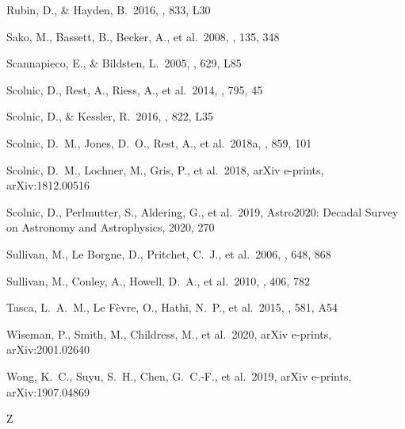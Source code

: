 \documentclass[]{aa} %
\begin{document}
\begin{thebibliography}{}
 Rubin, D., \& Hayden, B.\ 2016, \apjl, 833, L30


 Sako, M., Bassett, B., Becker, A., et al.\ 2008, \aj, 135, 348

 Scannapieco, E., \& Bildsten, L.\ 2005, \apjl, 629, L85 

 Scolnic, D., Rest, A., Riess, A., et al.\ 2014, \apj, 795, 45

 Scolnic, D., \& Kessler, R.\ 2016, \apjl, 822, L35


 Scolnic, D.~M., Jones, D.~O., Rest, A., et al.\ 2018a, \apj, 859, 101

 Scolnic, D.~M., Lochner, M., Gris, P., et al.\ 2018, arXiv e-prints, arXiv:1812.00516

 Scolnic, D., Perlmutter, S., Aldering, G., et al.\ 2019, Astro2020: Decadal Survey on Astronomy and Astrophysics, 2020, 270

 Sullivan, M., Le  Borgne, D., Pritchet, C.~J., et al.\ 2006, \apj, 648, 868 


 Sullivan, M., Conley, A., Howell, D.~A., et al.\ 2010, \mnras, 406, 782

 Tasca, L.~A.~M., Le F{\`e}vre, O., Hathi, N.~P., et al.\ 2015, \aap, 581, A54

 Wiseman, P., Smith, M., Childress, M., et al.\ 2020, arXiv e-prints, arXiv:2001.02640


 Wong, K.~C., Suyu, S.~H., Chen, G.~C.-F., et al.\ 2019, arXiv e-prints, arXiv:1907.04869

 Z
\end{thebibliography}
\end{document}
